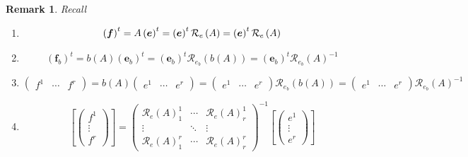 \documentclass[aps,preprint]{revtex4}
\newtheorem{remark}[theorem]{Remark}
\begin{document}
\begin{remark}
Recall

\begin{enumerate}
\item 
\begin{equation}
\left( \boldsymbol{f}\right) ^{t}=A\left( \boldsymbol{e}\right) ^{t}=\left( 
\boldsymbol{e}\right) ^{t}\mathcal{R}_{e}\left( A\right) =\left( \boldsymbol{%
e}\right) ^{t}\mathcal{R}_{e}\left( A\right)
\end{equation}

\item 
\begin{equation}
\left( \boldsymbol{f}_{b}\right) ^{t}=b\left( A\right) \left( \boldsymbol{e}%
_{b}\right) ^{t}=\left( \boldsymbol{e}_{b}\right) ^{t}\mathcal{R}%
_{e_{b}}\left( b\left( A\right) \right) =\left( \boldsymbol{e}_{b}\right)
^{t}\mathcal{R}_{e_{b}}\left( A\right) ^{-1}
\end{equation}

\item 
\begin{equation}
\left( 
\begin{array}{ccc}
f^{1} & \cdots & f^{r}%
\end{array}%
\right) =b\left( A\right) \left( 
\begin{array}{ccc}
e^{1} & \cdots & e^{r}%
\end{array}%
\right) =\left( 
\begin{array}{ccc}
e^{1} & \cdots & e^{r}%
\end{array}%
\right) \mathcal{R}_{e_{b}}\left( b\left( A\right) \right) =\left( 
\begin{array}{ccc}
e^{1} & \cdots & e^{r}%
\end{array}%
\right) \mathcal{R}_{e_{b}}\left( A\right) ^{-1}
\end{equation}

\item 
\begin{equation}
\left[ \left( 
\begin{array}{c}
f^{1} \\ 
\vdots \\ 
f^{r}%
\end{array}%
\right) \right] =\left( 
\begin{array}{ccc}
\mathcal{R}_{e}\left( A\right) _{1}^{1} & \cdots & \mathcal{R}_{e}\left(
A\right) _{r}^{1} \\ 
\vdots & \ddots & \vdots \\ 
\mathcal{R}_{e}\left( A\right) _{1}^{r} & \cdots & \mathcal{R}_{e}\left(
A\right) _{r}^{r}%
\end{array}%
\right) ^{-1}\left[ \left( 
\begin{array}{c}
e^{1} \\ 
\vdots \\ 
e^{r}%
\end{array}%
\right) \right]
\end{equation}


\end{enumerate}
\end{remark}
\end{document}
